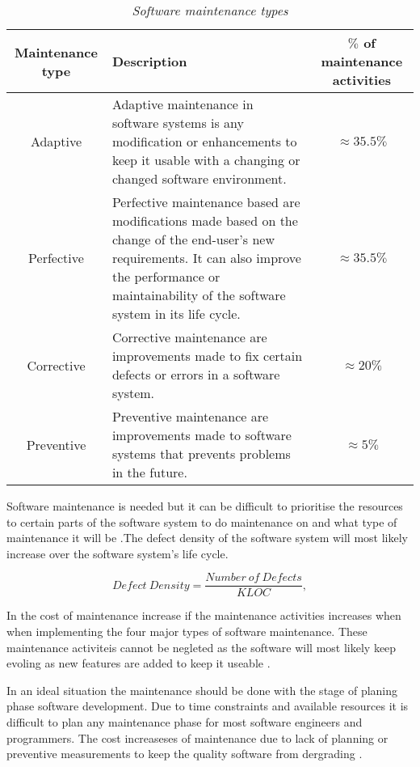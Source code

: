 \begin{table}[!htb]
	\centering
	\small
	\caption[Software maintenance types]
	{\textit{Software maintenance types \cite{Ping2010,Hasan2012,Mamone1994}}}
	\label{tbl:CH1_MaintenanceTypes}
	\begin{tabularx}{\textwidth}{|c|X|c|}
		\hline
		\textbf{Maintenance type} & \textbf{Description} & \textbf{$\%$ of maintenance activities} \\ \hline
		Adaptive & \raggedright Adaptive maintenance in software systems is any modification or enhancements to keep it usable with a changing or changed software environment. & $\approx 35.5\%$ \\ \hline
		Perfective & Perfective maintenance based are modifications made based on the change of the end-user's new requirements. It can also improve the performance or maintainability of the software system in its life cycle. & $\approx 35.5\%$ \\ \hline
		Corrective & \raggedright Corrective maintenance are improvements made to fix certain defects or errors in a software system. & $\approx 20\%$ \\ \hline
		Preventive & \raggedright  Preventive maintenance are improvements made to software systems that prevents problems in the future. & $\approx 5\%$ \\ \hline
	\end{tabularx}
\end{table}

Software maintenance is needed but it can be difficult to prioritise the resources to certain parts of the software system to do maintenance on and what type of maintenance it will be \cite{Mamone1994, Hasan2012}.The defect density of the software system will most likely increase over the software system's life cycle.

\begin{equation}
	\label{eq:Defect_Density}
	Defect~Density = \frac{Number~of~Defects}{KLOC},
\end{equation}

In  the cost of maintenance increase if the maintenance activities increases when when implementing the four major types of software maintenance. These maintenance activiteis cannot be negleted as the software will most likely keep evoling as new features are added to keep it useable \cite{Alenezi2016}. \par In an ideal situation the maintenance should be done with the stage of planing phase software development. Due to time constraints and available resources it is difficult to plan any maintenance phase for most software engineers and programmers. The cost increaseses of maintenance due to lack of planning or preventive measurements to keep the quality software from dergrading \cite{Alenezi2016}.

